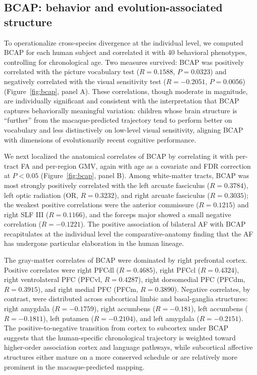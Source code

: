 \documentclass[11pt]{article}
\begin{document}
\subsection{BCAP: behavior and evolution-associated structure}

To operationalize cross-species divergence at the individual level, we computed BCAP for each human subject and correlated it with 40 behavioral phenotypes, controlling for chronological age. Two measures survived: BCAP was positively correlated with the picture vocabulary test ($R = 0.1588$, $P = 0.0323$) and negatively correlated with the visual sensitivity test ($R = -0.2051$, $P = 0.0056$) (Figure~\ref{fig:bcap}, panel A). These correlations, though moderate in magnitude, are individually significant and consistent with the interpretation that BCAP captures behaviorally meaningful variation: children whose brain structure is ``further'' from the macaque-predicted trajectory tend to perform better on vocabulary and less distinctively on low-level visual sensitivity, aligning BCAP with dimensions of evolutionarily recent cognitive performance.

We next localized the anatomical correlates of BCAP by correlating it with per-tract FA and per-region GMV, again with age as a covariate and FDR correction at $P < 0.05$ (Figure~\ref{fig:bcap}, panel B). Among white-matter tracts, BCAP was most strongly positively correlated with the left arcuate fasciculus ($R = 0.3784$), left optic radiation (OR, $R = 0.3232$), and right arcuate fasciculus ($R = 0.3035$); the weakest positive correlations were the anterior commissure ($R = 0.1215$) and right SLF III ($R = 0.1166$), and the forceps major showed a small negative correlation ($R = -0.1221$). The positive association of bilateral AF with BCAP recapitulates at the individual level the comparative-anatomy finding that the AF has undergone particular elaboration in the human lineage.

The gray-matter correlates of BCAP were dominated by right prefrontal cortex. Positive correlates were right PFCdl ($R = 0.4685$), right PFCcl ($R = 0.4324$), right ventrolateral PFC (PFCvl, $R = 0.4287$), right dorsomedial PFC (PFCdm, $R = 0.3915$), and right medial PFC (PFCm, $R = 0.3890$). Negative correlates, by contrast, were distributed across subcortical limbic and basal-ganglia structures: right amygdala ($R = -0.1759$), right accumbens ($R = -0.181$), left accumbens ($R = -0.1811$), left putamen ($R = -0.2104$), and left amygdala ($R = -0.2151$). The positive-to-negative transition from cortex to subcortex under BCAP suggests that the human-specific chronological trajectory is weighted toward higher-order association cortex and language pathways, while subcortical affective structures either mature on a more conserved schedule or are relatively more prominent in the macaque-predicted mapping.
\end{document}
